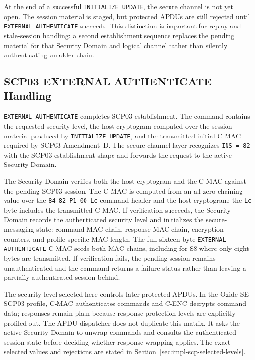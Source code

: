 At the end of a successful \texttt{INITIALIZE UPDATE}, the secure channel is
not yet open. The session material is staged, but protected APDUs are still
rejected until \texttt{EXTERNAL AUTHENTICATE} succeeds. This distinction is
important for replay and stale-session handling: a second establishment
sequence replaces the pending material for that Security Domain and logical
channel rather than silently authenticating an older chain.

\subsection{SCP03 EXTERNAL AUTHENTICATE Handling}
\label{sec:impl-scp-auth}

\texttt{EXTERNAL AUTHENTICATE} completes SCP03 establishment. The command
contains the requested security level, the host cryptogram computed over the
session material produced by \texttt{INITIALIZE UPDATE}, and the transmitted
initial C-MAC required by SCP03 Amendment~D. The secure-channel layer recognizes
\texttt{INS = 82} with the SCP03 establishment shape and forwards the request
to the active Security Domain.

The Security Domain verifies both the host cryptogram and the C-MAC against the
pending SCP03 session. The C-MAC is computed from an all-zero chaining value
over the \texttt{84 82 P1 00 Lc} command header and the host cryptogram; the
\texttt{Lc} byte includes the transmitted C-MAC. If verification succeeds, the
Security Domain records the authenticated security level and initializes the
secure-messaging state: command MAC chain, response MAC chain, encryption
counters, and profile-specific MAC length. The full sixteen-byte
\texttt{EXTERNAL AUTHENTICATE} C-MAC seeds both MAC chains, including for S8
where only eight bytes are transmitted. If verification fails, the pending
session remains unauthenticated and the command returns a failure status rather
than leaving a partially authenticated session behind.

The security level selected here controls later protected APDUs. In the
Oxide SE SCP03 profile, C-MAC authenticates commands and C-ENC decrypts command
data; responses remain plain because response-protection levels are explicitly
profiled out. The APDU dispatcher does not duplicate this matrix. It asks the
active Security Domain to unwrap commands and consults the authenticated
session state before deciding whether response wrapping applies. The exact
selected values and rejections are stated in
Section~\ref{sec:impl-scp-selected-levels}.

